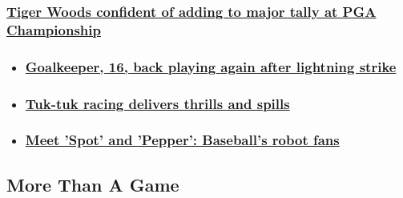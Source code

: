 \begin{itemize}
{  \subsubsection{\texorpdfstring{\href{/2020/08/05/golf/tiger-woods-pga-championship-golf-spt-intl/index.html}{Tiger
  Woods confident of adding to major tally at PGA
  Championship}}{Tiger Woods confident of adding to major tally at PGA Championship}}\label{tiger-woods-confident-of-adding-to-major-tally-at-pga-championship}}
\end{itemize}

\begin{itemize}
\item
  \hypertarget{goalkeeper-16-back-playing-again-after-lightning-strike}{%
  \subsubsection{\texorpdfstring{\href{/2020/07/22/football/znamya-truda-ivan-zaborovsky-recovery-spt-intl/index.html}{Goalkeeper,
  16, back playing again after lightning
  strike}}{Goalkeeper, 16, back playing again after lightning strike}}\label{goalkeeper-16-back-playing-again-after-lightning-strike}}
\item
  \hypertarget{tuk-tuk-racing-delivers-thrills-and-spills}{%
  \subsubsection{\texorpdfstring{\href{/2020/07/17/sport/tuk-tuk-racing-sri-lanka-spt-intl/index.html}{Tuk-tuk
  racing delivers thrills and
  spills}}{Tuk-tuk racing delivers thrills and spills}}\label{tuk-tuk-racing-delivers-thrills-and-spills}}
\item
  \hypertarget{meet-spot-and-pepper-baseballs-robot-fans}{%
  \subsubsection{\texorpdfstring{\href{/2020/07/10/sport/baseball-japan-robots-fans-spt-intl/index.html}{Meet
  'Spot' and 'Pepper': Baseball's robot
  fans}}{Meet 'Spot' and 'Pepper': Baseball's robot fans}}\label{meet-spot-and-pepper-baseballs-robot-fans}}
\end{itemize}

\hypertarget{more-than-a-game-}{%
\subsection{More Than A Game~}\label{more-than-a-game-}}

